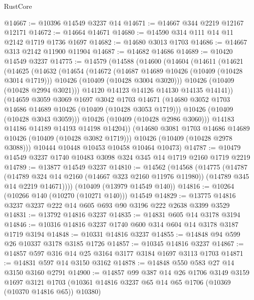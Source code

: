 \begin{lexlean}{RustCore}
\begin{coremodule}
@14667 := @10396 @14549 @3237 @14
@14671 := @14667 @344 @2219 @12167 @12171
@14672 := @14664 @14671
@14680 := @14590 @314 @111 @14 @11 @2142 @1719 @1736 @1697
@14682 := @14680 @3013 @1703
@14686 := @14667 @313 @2142 @11900 @11904
@14687 := @14682 @14686
@14689 := @10420 @14549 @3237
@14775 := @14579
    (@14588
      (@14600
        (@14604
          (@14611
            (@14621
              (@14625
                (@14632
                  (@14654
                    (@14672
                      (@14687 @14689 @10426 (@10409 (@10428 @3014 @1719)))
                      @10426
                      (@10409 (@10428 @3004 @3020)))
                    @10426
                    (@10409 (@10428 @2994 @3021)))
                  @14120
                  @14123
                  @14126
                  @14130
                  @14135
                  @14141))
              (@14659
                @3059
                @3069
                @1697
                @3042
                @1703
                @14671
                (@14680 @3052 @1703 @14686 @14689 @10426 (@10409 (@10428 @3053 @1719)))
                @10426
                (@10409 (@10428 @3043 @3059)))
              @10426
              (@10409 (@10428 @2986 @3060)))
            @14183
            @14186
            @14189
            @14193
            @14198
            @14204))
        (@14680 @3081 @1703 @14686 @14689 @10426 (@10409 (@10428 @3082 @1719)))
        @10426
        (@10409 (@10428 @2978 @3088)))
      @10444
      @10448
      @10453
      @10458
      @10464
      @10473)
@14787 := @10479 @14549 @3237 @1740 @10483 @3098 @324 @345 @14 @1719 @2160 @1719 @2219
@14789 := @13877 @14549 @3237
@14810 := @14562
    (@14568
      (@14775
        (@14787
          (@14789 @324 @14 @2160 (@14667 @323 @2160 @11976 @11980))
          (@14789 @345 @14 @2219 @14671))))
    (@10409 (@13979 @14549 @140))
@14816 := @10264 (@10266 @140 (@10270 (@10271 @140))) @14549
@14829 := @13775 @14816 @3237 @3237 @222 @14 @605 @693 @90 @3196 @222 @2638 @3399 @3529
@14831 := @13792 @14816 @3237
@14835 := @14831 @605 @14 @3178 @3194
@14846 := @10316 @14816 @3237 @1740 @600 @314 @604 @14 @3178 @3187 @1719 @3194
@14848 := @10331 @14816 @3237
@14855 := @14848 @94 @599 @26 @10337 @3178 @3185 @1726
@14857 := @10345 @14816 @3237
@14867 := @14857 @597 @316 @14 @25 @3164 @3177 @3184 @1697 @3113 @1703
@14871 := @14831 @597 @14 @3150 @3162
@14878 := @14848 @550 @583 @27 @14 @3150 @3160 @2791
@14900 := @14857
    @99
    @387
    @14
    @26
    @1706
    @3149
    @3159
    @1697
    @3121
    @1703
    (@10361 @14816 @3237 @65 @14 @65 @1706 (@10369 (@10370 @14816 @65)) @10380)

\end{coremodule}
\end{lexlean}

